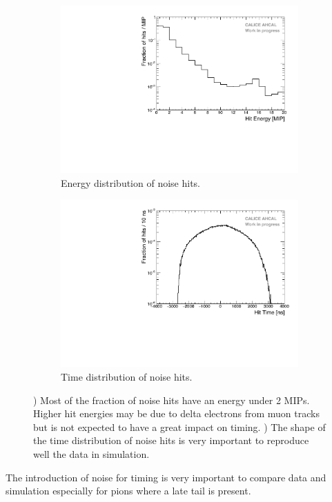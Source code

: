\begin{figure}[htbp!]
	\begin{subfigure}[t]{0.49\textwidth}
		\centering
		\includegraphics[width=1\linewidth]{../Thesis_Plots/Timing/Muons/Plots/Noise_Energy.pdf}
		\caption{Energy distribution of noise hits.} \label{fig:noise_energy}
	\end{subfigure}
	\hfill
	\begin{subfigure}[t]{0.49\textwidth}
		\centering
		\includegraphics[width=1\linewidth]{../Thesis_Plots/Timing/Muons/Plots/Noise_Time.pdf}
		\caption{Time distribution of noise hits.} \label{fig:noise_time}
	\end{subfigure}
	\caption{) Most of the fraction of noise hits have an energy under 2 MIPs. Higher hit energies may be due to delta electrons from muon tracks but is not expected to have a great impact on timing. ) The shape of the time distribution of noise hits is very important to reproduce well the data in simulation.}
\end{figure}

The introduction of noise for timing is very important to compare data and simulation especially for pions where a late tail is present.
